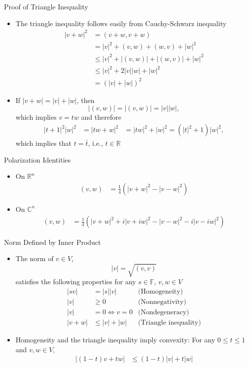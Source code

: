 \documentclass[usenames,dvipsnames,10pt]{beamer}
\newcommand\C{\mathbb{C}}
\newcommand\F{\mathbb{F}}
\newcommand{\R}{\mathbb{R}}
\begin{document}
\begin{frame}
  {Proof of Triangle Inequality}

  \begin{itemize}
  \item The triangle inequality follows easily from Cauchy-Schwarz inequality
    \begin{align*}
      |v+w|^2 &= (v+w,v+w)\\
              &= |v|^2 + (v,w) + (w,v) + |w|^2\\
              &\le |v|^2 + |(v,w)| + |(w,v)| + |w|^2\\
              &\le |v|^2 + 2|v||w| + |w|^2\\
              &= (|v|+|w|)^2
    \end{align*}
  \item If $|v+w|=|v|+|w|$, then
    \[
      |(v,w)| = |(v,w)| = |v||w|,
    \]
    which implies $v = tw$ and therefore
    \begin{align*}
      |t+1|^2|w|^2 &= |tw+w|^2&= |tw|^2 + |w|^2= (|t|^2+1)|w|^2,
    \end{align*}
    which implies that $t = \bar{t}$, i.e., $t \in \R$
  \end{itemize}
\end{frame}

\begin{frame}
  {Polarization Identities}

  \begin{itemize}
  \item On $\R^n$
    \begin{align*}
      (v,w) &= \frac{1}{4}(|v+w|^2 - |v-w|^2)
    \end{align*}
  \item On $\C^n$
    \begin{align*}
      (v,w) &= \frac{1}{4}(|v+w|^2 + i|v+iw|^2 - |v-w|^2 - i|v-iw|^2)
    \end{align*}
  \end{itemize}
\end{frame}

\begin{frame}
  {Norm Defined by Inner Product}

  \begin{itemize}
  \item The norm of $v \in V$,
    \[ |v| = \sqrt{(v,v)} \]
    satisfies the following properties for any $s \in \F$, $v, w \in V$
    \begin{align*}
      |sv| &= |s||v| &\text{(Homogeneity)}\\
      |v| &\ge 0 &\text{(Nonnegativity)}\\
      |v| &= 0 \iff v = 0 &\text{(Nondegeneracy)}\\
      |v+w| &\le |v|+|w| &\text{(Triangle inequality)}
    \end{align*}
  \item Homogeneity and the triangle inequality imply convexity: For any $0 \le t \le 1$ and $v, w \in V$,
    \begin{align*}
      |(1-t)v+tw| &\le (1-t)|v|+t|w|
    \end{align*}
  \end{itemize}
\end{frame}
\end{document}
